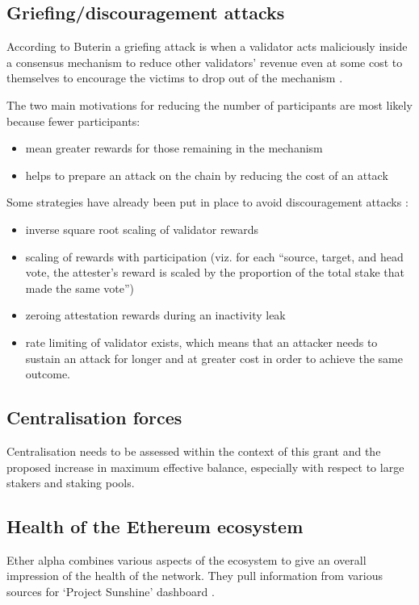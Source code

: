 \documentclass[UTF8]{article}
\begin{document}
\subsection{Griefing/discouragement attacks}
According to Buterin a griefing attack is when a validator acts maliciously inside a consensus mechanism to reduce other validators' revenue even at some cost to themselves to encourage the victims to drop out of the mechanism \cite{buterin2018c}.

The two main motivations for reducing the number of participants are most likely because fewer participants:
\begin{itemize}
\item mean greater rewards for those remaining in the mechanism
\item helps to prepare an attack on the chain by reducing the cost of an attack
\end{itemize}

Some strategies have already been put in place to avoid discouragement attacks \cite{Edgington2023}:
\begin{itemize}
\item inverse square root scaling of validator rewards
\item scaling of rewards with participation (viz. for each ``source, target, and head vote, the attester's reward is scaled by the proportion of the total stake that made the same vote'')
\item zeroing attestation rewards during an inactivity leak
\item rate limiting of validator exists, which means that an attacker needs to sustain an attack for longer and at greater cost in order to achieve the same outcome.
\end{itemize}

\subsection{Centralisation forces}
Centralisation needs to be assessed within the context of this grant and the proposed increase in maximum effective balance, especially with respect to large stakers and staking pools.

\subsection{Health of the Ethereum ecosystem}
Ether alpha combines various aspects of the ecosystem to give an overall impression of the health of the network. They pull information from various sources for `Project Sunshine' dashboard \cite{easunshine}. 
\end{document}
